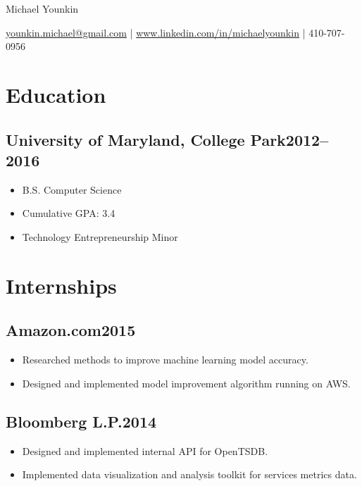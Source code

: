 \documentclass[letterpaper]{article}
\newcommand{\subsectiondate}[2]{\subsection*{#1\hfill#2}}
\begin{document}
\begin{center}
    {\LARGE Michael Younkin}

    \href{mailto:younkin.michael@gmail.com}{younkin.michael@gmail.com} |
    \href{https://www.linkedin.com/in/michaelyounkin}{www.linkedin.com/in/michaelyounkin} |
    410-707-0956
\end{center}


\section*{Education}

\subsectiondate{University of Maryland, College Park}{2012--2016}

\begin{itemize}
    \item B.S. Computer Science
    \item Cumulative GPA\@: 3.4
    \item Technology Entrepreneurship Minor
\end{itemize}


\section*{Internships}

\subsectiondate{Amazon.com}{2015}

\begin{itemize}
    \item Researched methods to improve machine learning model accuracy.
    \item Designed and implemented model improvement algorithm running on AWS.
\end{itemize}

\subsectiondate{Bloomberg L.P.}{2014}

\begin{itemize}
    \item Designed and implemented internal API for OpenTSDB.
    \item Implemented data visualization and analysis toolkit for services metrics data.
\end{itemize}
\end{document}
